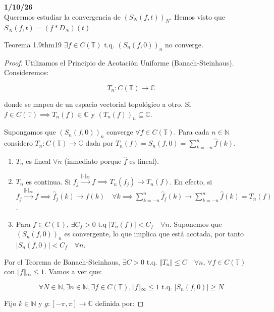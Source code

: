 \textbf{1/10/26} 
\\
Queremos estudiar la convergencia de $(S_N(f,t))_N$. Hemos visto que $S_N(f,t) = (f * D_N)(t)$

\begin{teorema}{Teorema 1.9}{thm19}
$\exists f \in C(\mathbb{T})$ t.q. $(S_n(f,0))_n$ no converge.
\end{teorema}

\begin{proof}
Utilizamos el Principio de Acotación Uniforme (Banach-Steinhaus). Consideremos:


$$T_n : C(\mathbb{T}) \longrightarrow \mathbb{C}$$


donde se mapea de un espacio vectorial topológico a otro. Si $f \in C(\mathbb{T}) \implies T_n(f) \in \mathbb{C}$ y $(T_n(f))_n \subseteq \mathbb{C}$.

Supongamos que $(S_n(f,0))_n$ converge $\forall f \in C(\mathbb{T})$. Para cada $n \in \mathbb{N}$ considero $T_n: C(\mathbb{T}) \longrightarrow \mathbb{C}$ dada por $T_n(f) = S_n(f,0) = \sum_{k=-n}^n \hat{f}(k)$.

\begin{enumerate}
\item[(a)] $T_n$ es lineal $\forall n$ (inmediato porque $\hat{f}$ es lineal).
\item[(b)] $T_n$ es continua. Si $f_j \xrightarrow{\Vert{}\cdot\Vert{}_\infty} f \implies T_n(f_j) \rightarrow T_n(f)$.
En efecto, si $f_j \xrightarrow{\Vert{}\cdot\Vert{}_\infty} f \implies \hat{f}_j(k) \rightarrow \hat{f}(k) \quad \forall k \implies \sum_{k=-n}^n \hat{f}_j(k) \rightarrow \sum_{k=-n}^n \hat{f}(k) = T_n(f)$.
\item[(c)] Para $f \in C(\mathbb{T})$, $\exists C_f > 0$ t.q $\vert{}T_n(f)\vert{} < C_f \quad \forall n$. Suponemos que $(S_n(f,0))_n$ es convergente, lo que implica que está acotada, por tanto $\vert{}S_n(f,0)\vert{} < C_f \quad \forall n$.
\end{enumerate}

Por el Teorema de Banach-Steinhaus, $\exists C > 0$ t.q. $\Vert{}T_n\Vert{} \le C \quad \forall n$, $\forall f \in C(\mathbb{T})$ con $\Vert{}f\Vert{}_\infty \le 1$. Vamos a ver que:


$$\forall N \in \mathbb{N}, \exists n \in \mathbb{N}, \exists f \in C(\mathbb{T}), \Vert{}f\Vert{}_\infty \le 1 \text{ t.q. } \vert{}S_n(f,0)\vert{} \ge N $$

Fijo $k \in \mathbb{N}$ y $g: [-\pi, \pi] \rightarrow \mathbb{C}$ definida por:



\end{proof}
